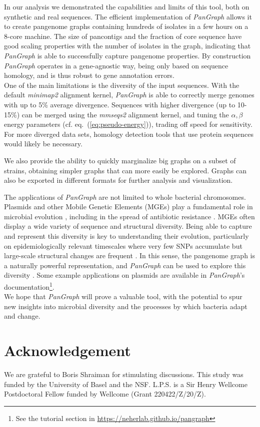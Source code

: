 \documentclass[aps,rmp,reprint,superscriptaddress,notitlepage,10pt]{revtex4-1}
\begin{document}
In our analysis we demonstrated the capabilities and limits of this tool, both on synthetic and real sequences. The efficient implementation of \textit{PanGraph} allows it to create pangenome graphs containing hundreds of isolates in a few hours on a 8-core machine. The size of pancontigs and the fraction of core sequence have good scaling properties with the number of isolates in the graph, indicating that \textit{PanGraph} is able to successfully capture pangenome properties. By construction \textit{PanGraph} operates in a gene-agnostic way, being only based on sequence homology, and is thus robust to gene annotation errors.\\
One of the main limitations is the diversity of the input sequences. With the default \textit{minimap2} alignment kernel, \textit{PanGraph} is able to correctly merge genomes with up to 5\% average divergence. Sequences with higher divergence (up to 10-15\%) can be merged using the \textit{mmseqs2} alignment kernel, and tuning the $\alpha, \beta$ energy parameters (cf. eq.~(\ref{eq:pseudo-energy})), trading off speed for sensitivity.
For more diverged data sets, homology detection tools that use protein sequences would likely be necessary.

We also provide the ability to quickly marginalize big graphs on a subset of strains, obtaining simpler graphs that can more easily be explored. Graphs can also be exported in different formats for further analysis and visualization.

The applications of \textit{PanGraph} are not limited to whole bacterial chromosomes. Plasmids and other Mobile Genetic Elements (MGEs) play a fundamental role in microbial evolution \cite{haudiquet2022selfish,frost2005mobile}, including in the spread of antibiotic resistance \cite{van2018spread}. MGEs often display a wide variety of sequence and structural diversity. Being able to capture and represent this diversity is key to understanding their evolution, particularly on epidemiologically relevant timescales where very few SNPs accumulate but large-scale structural changes are frequent \cite{Sheppard2016, Noll2018}.
In this sense, the pangenome graph is a naturally powerful representation, and \textit{PanGraph} can be used to explore this diversity \cite{liam_preparation}. Some example applications on plasmids are available in \textit{PanGraph}'s documentation\footnote{See the tutorial section in \url{https://neherlab.github.io/pangraph}}.\\

We hope that \textit{PanGraph} will prove a valuable tool, with the potential to spur new insights into microbial diversity and the processes by which bacteria adapt and change.


\section*{Acknowledgement}
We are grateful to Boris Shraiman for stimulating discussions.
This study was funded by the University of Basel and the NSF.
L.P.S. is a Sir Henry Wellcome Postdoctoral Fellow funded by Wellcome (Grant 220422/Z/20/Z).

{}
\end{document}
